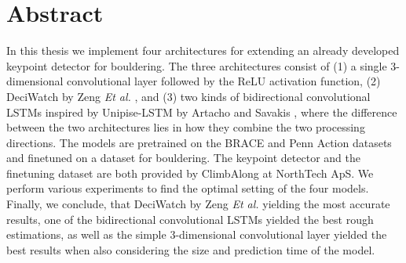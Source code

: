 \documentclass[./main.tex]{subfiles}
\begin{document}
\section*{Abstract}
In this thesis we implement four architectures for extending an already developed keypoint detector for bouldering. The three architectures consist of (1) a single 3-dimensional convolutional layer followed by the ReLU activation function, (2) DeciWatch by Zeng \textit{Et al.} \cite{https://doi.org/10.48550/arxiv.2203.08713}, and (3) two kinds of bidirectional convolutional LSTMs inspired by Unipise-LSTM by Artacho and Savakis \cite{https://doi.org/10.48550/arxiv.2001.08095}, where the difference between the two architectures lies in how they combine the two processing directions. The models are pretrained on the BRACE and Penn Action datasets and finetuned on a dataset for bouldering. The keypoint detector and the finetuning dataset are both provided by ClimbAlong at NorthTech ApS. We perform various experiments to find the optimal setting of the four models. Finally, we conclude, that DeciWatch by Zeng \textit{Et al.} \cite{https://doi.org/10.48550/arxiv.2203.08713} yielding the most accurate results, one of the bidirectional convolutional LSTMs yielded the best rough estimations, as well as the simple 3-dimensional convolutional layer yielded the best results when also considering the size and prediction time of the model.
\end{document}
